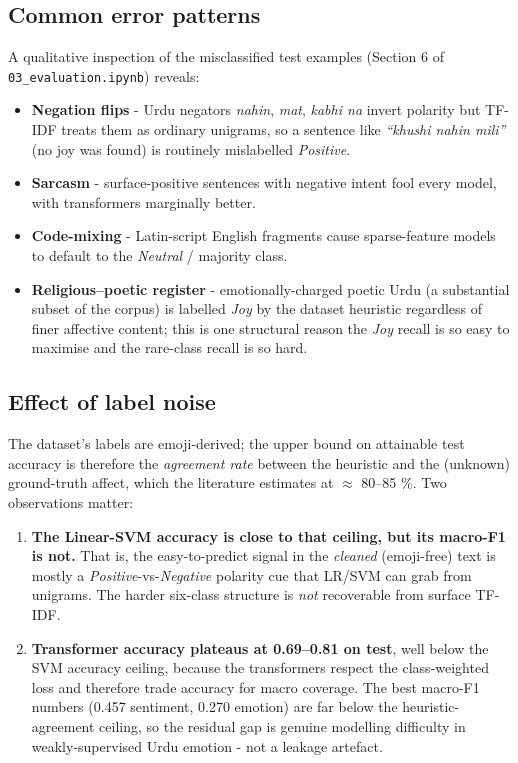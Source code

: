 \documentclass[
  english,
  11pt,
]{article}
\providecommand{\tightlist}{%
  \setlength{\itemsep}{0pt}\setlength{\parskip}{0pt}}
\begin{document}
\subsection{Common error patterns}\label{common-error-patterns}

A qualitative inspection of the misclassified test examples (Section 6
of \texttt{03\_evaluation.ipynb}) reveals:

\begin{itemize}
\tightlist
\item
  \textbf{Negation flips} - Urdu negators \emph{nahin}, \emph{mat},
  \emph{kabhi na} invert polarity but TF-IDF treats them as ordinary
  unigrams, so a sentence like \emph{``khushi nahin mili''} (no joy was
  found) is routinely mislabelled \emph{Positive}.
\item
  \textbf{Sarcasm} - surface-positive sentences with negative intent
  fool every model, with transformers marginally better.
\item
  \textbf{Code-mixing} - Latin-script English fragments cause
  sparse-feature models to default to the \emph{Neutral} / majority
  class.
\item
  \textbf{Religious--poetic register} - emotionally-charged poetic
  Urdu (a substantial subset of the corpus) is labelled \emph{Joy} by
  the dataset heuristic regardless of finer affective content; this is
  one structural reason the \emph{Joy} recall is so easy to maximise and
  the rare-class recall is so hard.
\end{itemize}

\subsection{Effect of label noise}\label{effect-of-label-noise}

The dataset's labels are emoji-derived; the upper bound on attainable
test accuracy is therefore the \emph{agreement rate} between the
heuristic and the (unknown) ground-truth affect, which the literature
estimates at \(\approx\) 80--85 \%. Two observations matter:

\begin{enumerate}
\def\labelenumi{\arabic{enumi}.}
\tightlist
\item
  \textbf{The Linear-SVM accuracy is close to that ceiling, but its
  macro-F1 is not.} That is, the easy-to-predict signal in the
  \emph{cleaned} (emoji-free) text is mostly a
  \emph{Positive}-vs-\emph{Negative} polarity cue that LR/SVM can grab
  from unigrams. The harder six-class structure is \emph{not}
  recoverable from surface TF-IDF.
\item
  \textbf{Transformer accuracy plateaus at 0.69--0.81 on test}, well
  below the SVM accuracy ceiling, because the transformers respect the
  class-weighted loss and therefore trade accuracy for macro coverage.
  The best macro-F1 numbers (0.457 sentiment, 0.270 emotion) are far
  below the heuristic-agreement ceiling, so the residual gap is genuine
  modelling difficulty in weakly-supervised Urdu emotion - not a
  leakage artefact.
\end{enumerate}
\end{document}
